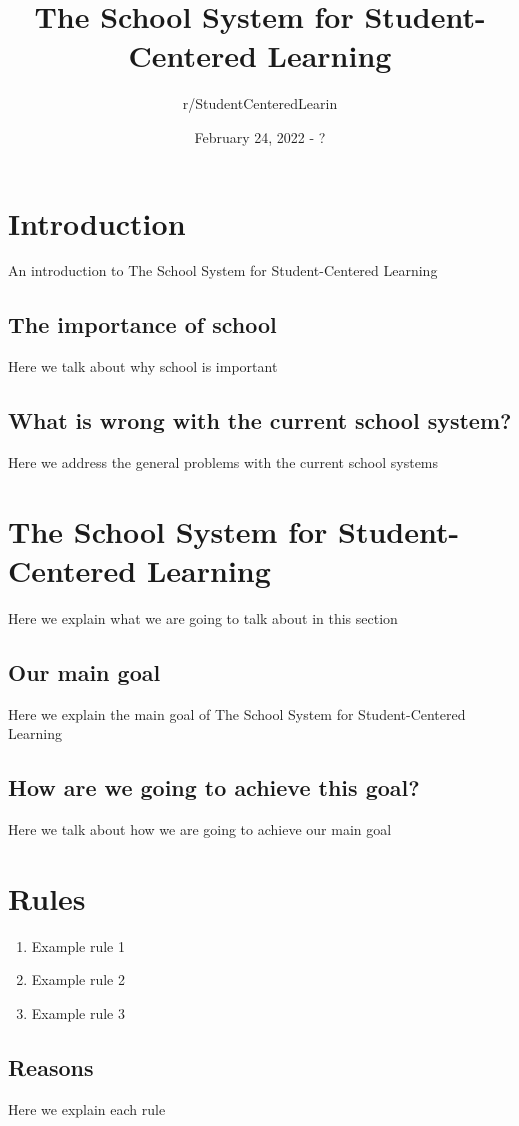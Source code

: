 \documentclass[titlepage]{article}
\author{r/StudentCenteredLearin}
\title{The School System for Student-Centered Learning}
\date{February 24, 2022 - ?}
\begin{document}
\maketitle
\newpage
\tableofcontents
\newpage
\section{Introduction}
An introduction to The School System for Student-Centered Learning
\subsection{The importance of school}
Here we talk about why school is important
\subsection{What is wrong with the current school system?}
Here we address the general problems with the current school systems


\newpage
\section{The School System for Student-Centered Learning}
Here we explain what we are going to talk about in this section
\subsection{Our main goal}
Here we explain the main goal of The School System for Student-Centered Learning
\subsection{How are we going to achieve this goal?}
Here we talk about how we are going to achieve our main goal

\newpage
\section{Rules}
\begin{enumerate}
	\item Example rule 1
	\item Example rule 2
	\item Example rule 3
\end{enumerate}
\subsection{Reasons}
Here we explain each rule
\end{document}
